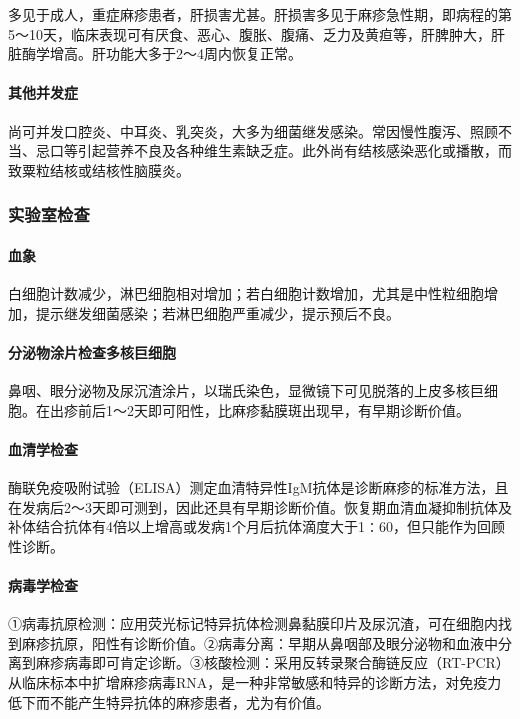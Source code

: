 多见于成人，重症麻疹患者，肝损害尤甚。肝损害多见于麻疹急性期，即病程的第5～10天，临床表现可有厌食、恶心、腹胀、腹痛、乏力及黄疸等，肝脾肿大，肝脏酶学增高。肝功能大多于2～4周内恢复正常。

\paragraph{其他并发症}

尚可并发口腔炎、中耳炎、乳突炎，大多为细菌继发感染。常因慢性腹泻、照顾不当、忌口等引起营养不良及各种维生素缺乏症。此外尚有结核感染恶化或播散，而致粟粒结核或结核性脑膜炎。

\subsubsection{实验室检查}

\paragraph{血象}

白细胞计数减少，淋巴细胞相对增加；若白细胞计数增加，尤其是中性粒细胞增加，提示继发细菌感染；若淋巴细胞严重减少，提示预后不良。

\paragraph{分泌物涂片检查多核巨细胞}

鼻咽、眼分泌物及尿沉渣涂片，以瑞氏染色，显微镜下可见脱落的上皮多核巨细胞。在出疹前后1～2天即可阳性，比麻疹黏膜斑出现早，有早期诊断价值。

\paragraph{血清学检查}

酶联免疫吸附试验（ELISA）测定血清特异性IgM抗体是诊断麻疹的标准方法，且在发病后2～3天即可测到，因此还具有早期诊断价值。恢复期血清血凝抑制抗体及补体结合抗体有4倍以上增高或发病1个月后抗体滴度大于1∶60，但只能作为回顾性诊断。

\paragraph{病毒学检查}

①病毒抗原检测：应用荧光标记特异抗体检测鼻黏膜印片及尿沉渣，可在细胞内找到麻疹抗原，阳性有诊断价值。②病毒分离：早期从鼻咽部及眼分泌物和血液中分离到麻疹病毒即可肯定诊断。③核酸检测：采用反转录聚合酶链反应（RT-PCR）从临床标本中扩增麻疹病毒RNA，是一种非常敏感和特异的诊断方法，对免疫力低下而不能产生特异抗体的麻疹患者，尤为有价值。

